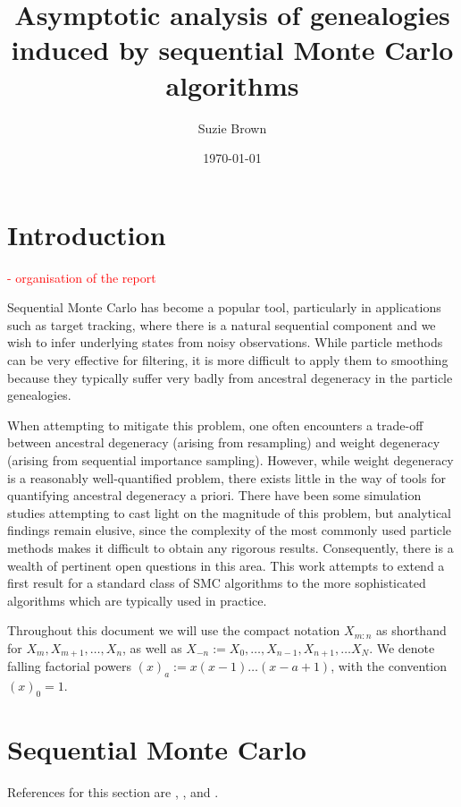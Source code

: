 \documentclass[fleqn]{article}
\title{Asymptotic analysis of genealogies induced by sequential Monte Carlo algorithms}
\author{Suzie Brown}
\date{\today}
\begin{document}
\maketitle
\thispagestyle{fancy}

\section{Introduction}
\textcolor{red}{
- organisation of the report\\
}

Sequential Monte Carlo has become a popular tool, particularly in applications such as target tracking, where there is a natural sequential component and we wish to infer underlying states from noisy observations.
While particle methods can be very effective for filtering, it is more difficult to apply them to smoothing because they typically suffer very badly from ancestral degeneracy in the particle genealogies.

When attempting to mitigate this problem, one often encounters a trade-off between ancestral degeneracy (arising from resampling) and weight degeneracy (arising from sequential importance sampling). However, while weight degeneracy is a reasonably well-quantified problem, there exists little in the way of tools for quantifying ancestral degeneracy a priori. There have been some simulation studies attempting to cast light on the magnitude of this problem, but analytical findings remain elusive, since the complexity of the most commonly used particle methods makes it difficult to obtain any rigorous results.
Consequently, there is a wealth of pertinent open questions in this area. This work attempts to extend a first result for a standard class of SMC algorithms to the more sophisticated algorithms which are typically used in practice.

Throughout this document we will use the compact notation $X_{m:n}$ as shorthand for $X_m, X_{m+1}, \dots, X_n$, as well as $X_{-n} := X_0, \dots, X_{n-1}, X_{n+1}, \dots X_{N}$.
We denote falling factorial powers $(x)_a := x(x-1)\dots(x-a+1)$, with the convention $(x)_0 = 1$.

\section{Sequential Monte Carlo}
References for this section are \citet{doucet2001}, \citet{delmoral2006}, and \citet{doucet2009}.
\end{document}
